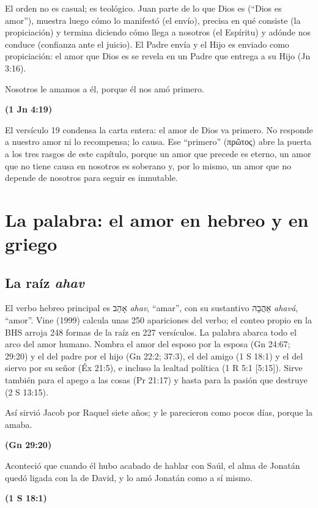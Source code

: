 \documentclass[11pt,letterpaper]{article}
\newcommand{\heb}[1]{\mbox{\foreignlanguage{hebrew}{#1}}}
\newcommand{\grc}[1]{\foreignlanguage{ancientgreek}{#1}}
\newcommand{\fuente}[1]{\par\hfill{\upshape\bfseries\small\textcolor{azul}{#1}}}
\begin{document}
El orden no es casual; es teológico. Juan parte de lo que Dios es (``Dios es amor''), muestra luego cómo lo manifestó (el envío), precisa en qué consiste (la propiciación) y termina diciendo cómo llega a nosotros (el Espíritu) y adónde nos conduce (confianza ante el juicio). El Padre envía y el Hijo es enviado como propiciación: el amor que Dios es se revela en un Padre que entrega a su Hijo (Jn 3:16).

\begin{cita}Nosotros le amamos a él, porque él nos amó primero.\fuente{(1 Jn 4:19)}\end{cita}

El versículo 19 condensa la carta entera: el amor de Dios va primero. No responde a nuestro amor ni lo recompensa; lo causa. Ese ``primero'' (\grc{πρῶτος}) abre la puerta a los tres rasgos de este capítulo, porque un amor que precede es eterno, un amor que no tiene causa en nosotros es soberano y, por lo mismo, un amor que no depende de nosotros para seguir es inmutable.

\section{La palabra: el amor en hebreo y en griego}

\subsection{La raíz \emph{ahav}}
El verbo hebreo principal es \heb{אָהַב} \emph{ahav}, ``amar'', con su sustantivo \heb{אַהֲבָה} \emph{ahavá}, ``amor''. Vine (1999) calcula unas 250 apariciones del verbo; el conteo propio en la BHS arroja 248 formas de la raíz en 227 versículos. La palabra abarca todo el arco del amor humano. Nombra el amor del esposo por la esposa (Gn 24:67; 29:20) y el del padre por el hijo (Gn 22:2; 37:3), el del amigo (1 S 18:1) y el del siervo por su señor (Éx 21:5), e incluso la lealtad política (1 R 5:1 [5:15]). Sirve también para el apego a las cosas (Pr 21:17) y hasta para la pasión que destruye (2 S 13:15).

\begin{cita}Así sirvió Jacob por Raquel siete años; y le parecieron como pocos días, porque la amaba.\fuente{(Gn 29:20)}\end{cita}

\begin{cita}Aconteció que cuando él hubo acabado de hablar con Saúl, el alma de Jonatán quedó ligada con la de David, y lo amó Jonatán como a sí mismo.\fuente{(1 S 18:1)}\end{cita}
\end{document}
